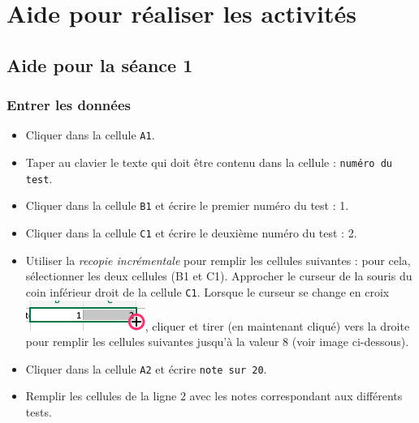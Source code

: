 \section{Aide pour réaliser les activités}\label{aideExcel}

\subsection{Aide pour la séance 1}

\subsubsection{Entrer les données}

\begin{itemize}
\item Cliquer dans la cellule \texttt{A1}.
\item Taper au clavier le texte qui doit être contenu dans la cellule : \texttt{numéro du test}.
\item Cliquer dans la cellule \texttt{B1} et écrire le premier numéro du test : 1.
\item Cliquer dans la cellule \texttt{C1} et écrire le deuxième numéro du test : 2.
\item Utiliser la \emph{recopie incrémentale} pour remplir les cellules suivantes : pour cela, sélectionner les deux cellules (B1 et C1). Approcher le curseur de la souris du coin inférieur droit de la cellule \texttt{C1}. Lorsque le curseur se change en croix
\includegraphics[scale=.4]{./images/tableur/recopieIncrementale_Excel_crop}, cliquer et tirer (en maintenant cliqué) vers la droite pour remplir les cellules suivantes jusqu'à la valeur 8 (voir image ci-dessous).
\end{itemize}


\begin{itemize}
\item Cliquer dans la cellule \texttt{A2} et écrire \texttt{note sur 20}.
\item Remplir les cellules de la ligne 2 avec les notes correspondant aux différents tests.
\end{itemize}





